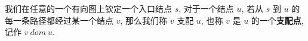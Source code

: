 我们在任意的一个有向图上钦定一个入口结点 \(s\), 对于一个结点 \(u\), 若从 \(s\) 到 \(u\) 的每一条路径都经过某一个结点 \(v\), 那么我们称 \(v\) 支配 \(u\), 也称 \(v\) 是 \(u\) 的一个\textbf{支配点}, 记作 \(v\ dom\ u\).
